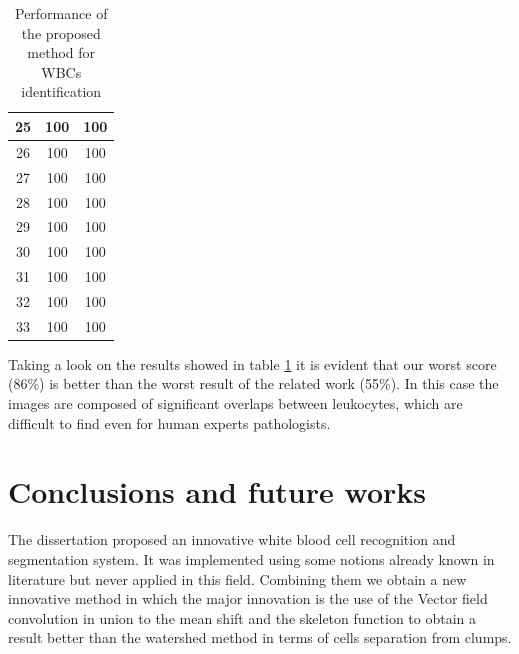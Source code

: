 \begin{table}
\begin{tabular}{|c|c|c|}
\hline
25 &  100 & 100 \\ 
\hline
26 &  100 & 100 \\ 
\hline
27 &  100 & 100 \\ 
\hline
28 &  100 & 100 \\ 
\hline
29 &  100 & 100 \\ 
\hline
30 &  100 & 100 \\ 
\hline
31 &  100 & 100 \\ 
\hline
32 &  100 & 100 \\ 
\hline
33 &  100 & 100 \\
\hline
\end{tabular} 
\caption{Performance of the proposed method for WBCs identification}
\label{resulttab}
\end{table}
Taking a look on the results showed in table \ref{resulttab} it is evident that our worst score (86\%) is better than the worst result of the related work (55\%). In this case the images are composed of significant overlaps between leukocytes, which are difficult to find even for human experts pathologists.




\section{Conclusions and future works}
The dissertation proposed an innovative white blood cell recognition and segmentation system. It was implemented using some notions already known in literature but never applied in this field. Combining them we obtain a new innovative method in which the major innovation is the use of the Vector field convolution in union to the mean shift and the skeleton function to obtain a result better than the watershed method in terms of cells separation from clumps.

\bigskip

